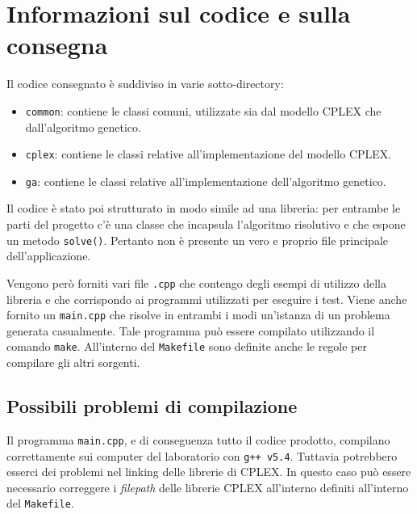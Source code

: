 
\section{Informazioni sul codice e sulla consegna}

Il codice consegnato è suddiviso in varie sotto-directory:

\begin{itemize}
	\item \texttt{common}: contiene le classi comuni, utilizzate sia dal modello CPLEX che dall'algoritmo genetico.
	\item \texttt{cplex}: contiene le classi relative all'implementazione del modello CPLEX.
	\item \texttt{ga}: contiene le classi relative all'implementazione dell'algoritmo genetico.
\end{itemize}

Il codice è stato poi strutturato in modo simile ad una libreria: per entrambe le parti del progetto c'è una classe che incapsula l'algoritmo risolutivo e che espone un metodo \texttt{solve()}.
Pertanto non è presente un vero e proprio file principale dell'applicazione.

Vengono però forniti vari file \texttt{.cpp} che contengo degli esempi di utilizzo della libreria e che corrispondo ai programmi utilizzati per eseguire i test.
Viene anche fornito un \texttt{main.cpp} che risolve in entrambi i modi un'istanza di un problema generata casualmente. Tale programma può essere compilato utilizzando il comando \texttt{make}.
All'interno del \texttt{Makefile} sono definite anche le regole per compilare gli altri sorgenti.


\subsection{Possibili problemi di compilazione}

Il programma \texttt{main.cpp}, e di conseguenza tutto il codice prodotto, compilano correttamente sui computer del laboratorio con \texttt{g++ v5.4}.
Tuttavia potrebbero esserci dei problemi nel linking delle librerie di CPLEX. In questo caso può essere necessario correggere i \textit{filepath} delle librerie CPLEX all'interno definiti all'interno del \texttt{Makefile}.
